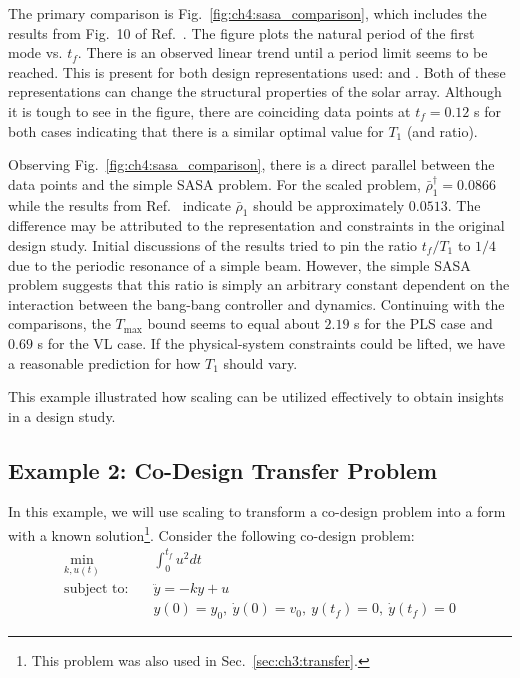 The primary comparison is Fig.~\ref{fig:ch4:sasa_comparison}, which includes the results from Fig.~10 of Ref.~\cite{Chilan2017a}.
The figure plots the natural period of the first mode vs. $t_f$.
There is an observed linear trend until a period limit seems to be reached.
This is present for both design representations used:  and .
Both of these representations can change the structural properties of the solar array.
Although it is tough to see in the figure, there are coinciding data points at $t_f=0.12$ s for both cases indicating that there is a similar optimal value for $T_1$ (and ratio).



Observing Fig.~\ref{fig:ch4:sasa_comparison}, there is a direct parallel between the data points and the simple SASA problem.
For the scaled problem, $\bar{\rho}_1^\dagger = 0.0866$ while the results from Ref.~\cite{Chilan2017a} indicate $\bar{\rho}_1$ should be approximately $0.0513$.
The difference may be attributed to the representation and constraints in the original design study.
Initial discussions of the results tried to pin the ratio $t_f/T_1$ to $1/4$ due to the periodic resonance of a simple beam.
However, the simple SASA problem suggests that this ratio is simply an arbitrary constant dependent on the interaction between the bang-bang controller and dynamics.
Continuing with the comparisons, the $T_{\max}$ bound seems to equal about $2.19$ s for the PLS case and $0.69$ s for the VL case.
If the physical-system constraints could be lifted, we have a reasonable prediction for how $T_1$ should vary.

This example illustrated how scaling can be utilized effectively to obtain insights in a design study.

\subsection{Example 2: Co-Design Transfer Problem \label{sec:ch4:transfer}}

In this example, we will use scaling to transform a co-design problem into a form with a known solution\footnote{This problem was also used in Sec.~\ref{sec:ch3:transfer}.}. Consider the following co-design problem:
\begin{subequations}
\label{eq:ch4:ex2_prob_1}
\begin{align}
\min_{k, u(t)}  \quad & \int_{0}^{t_f} u^2 dt \\
\text{subject to:} \quad & \ddot{y} = - k y + u \\
& y(0) = y_0, \ \dot{y}(0) = v_0, \ y(t_f) = 0, \ \dot{y}(t_f) = 0
\end{align}
\end{subequations}

